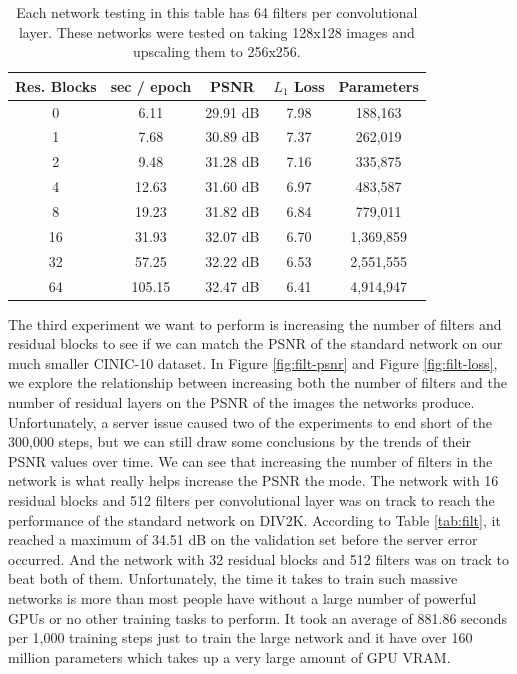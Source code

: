 \documentclass[conference]{IEEEtran}
\begin{document}
\begin{table}[htbp]
  \centering
  \caption{Each network testing in this table has 64 filters per convolutional layer. These networks were tested on taking 128x128 images and upscaling them to 256x256.}
  \label{tab:res}
  \begin{tabular}{c|c|c|c|c}
    Res. Blocks & sec / epoch & PSNR     & $L_1$ Loss & Parameters \\ \hline
    0           & 6.11        & 29.91 dB & 7.98       & 188,163    \\
    1           & 7.68        & 30.89 dB & 7.37       & 262,019    \\
    2           & 9.48        & 31.28 dB & 7.16       & 335,875    \\
    4           & 12.63       & 31.60 dB & 6.97       & 483,587    \\
    8           & 19.23       & 31.82 dB & 6.84       & 779,011    \\
    16          & 31.93       & 32.07 dB & 6.70       & 1,369,859  \\
    32          & 57.25       & 32.22 dB & 6.53       & 2,551,555  \\
    64          & 105.15      & 32.47 dB & 6.41       & 4,914,947  \\
  \end{tabular}
\end{table}

The third experiment we want to perform is increasing the number of filters and residual blocks to see if we can match the PSNR of the standard network on our much smaller CINIC-10 dataset.
In Figure \ref{fig:filt-psnr} and Figure \ref{fig:filt-loss}, we explore the relationship between increasing both the number of filters and the number of residual layers on the PSNR of the images the networks produce.
Unfortunately, a server issue caused two of the experiments to end short of the 300,000 steps, but we can still draw some conclusions by the trends of their PSNR values over time.
We can see that increasing the number of filters in the network is what really helps increase the PSNR the mode.
The network with 16 residual blocks and 512 filters per convolutional layer was on track to reach the performance of the standard network on DIV2K.
According to Table \ref{tab:filt}, it reached a maximum of 34.51 dB on the validation set before the server error occurred.
And the network with 32 residual blocks and 512 filters was on track to beat both of them.
Unfortunately, the time it takes to train such massive networks is more than most people have without a large number of powerful GPUs or no other training tasks to perform.
It took an average of 881.86 seconds per 1,000 training steps just to train the large network and it have over 160 million parameters which takes up a very large amount of GPU VRAM.
\end{document}
